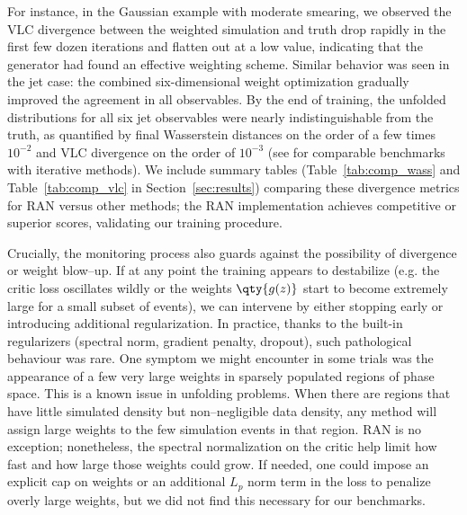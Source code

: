         For instance, in the Gaussian example with moderate smearing, we observed the VLC divergence between the weighted simulation and truth drop rapidly in the first few dozen iterations and flatten out at a low value, indicating that the generator had found an effective weighting scheme.
        Similar behavior was seen in the jet case: the combined six-dimensional weight optimization gradually improved the agreement in all observables.
        By the end of training, the unfolded distributions for all six jet observables were nearly indistinguishable from the truth, as quantified by final Wasserstein distances on the order of a few times $10^{-2}$ and VLC divergence on the order of $10^{-3}$ (see  for comparable benchmarks with iterative methods).
        We include summary tables (Table~\ref{tab:comp_wass} and Table~\ref{tab:comp_vlc} in Section~\ref{sec:results}) comparing these divergence metrics for RAN versus other methods; the RAN implementation achieves competitive or superior scores, validating our training procedure.

        Crucially, the monitoring process also guards against the possibility of divergence or weight blow--up.
        If at any point the training appears to destabilize (e.g. the critic loss oscillates wildly or the weights $\qty{g(z)}$ start to become extremely large for a small subset of events), we can intervene by either stopping early or introducing additional regularization.
        In practice, thanks to the built-in regularizers (spectral norm, gradient penalty, dropout), such pathological behaviour was rare.
        One symptom we might encounter in some trials was the appearance of a few very large weights in sparsely populated regions of phase space.
        This is a known issue in unfolding problems.
        When there are regions that have little simulated density but non--negligible data density, any method will assign large weights to the few simulation events in that region.
        RAN is no exception;
        nonetheless, the spectral normalization on the critic help limit how fast and how large those weights could grow.
        If needed, one could impose an explicit cap on weights or an additional \(L_p\) norm term in the loss to penalize overly large weights, but we did not find this necessary for our benchmarks.

